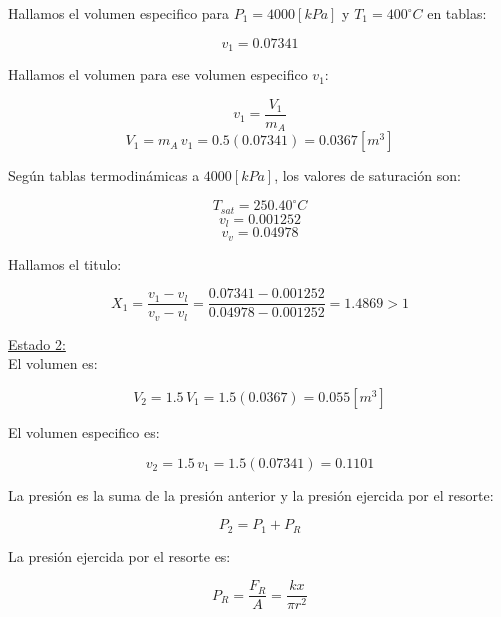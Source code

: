 \documentclass[letter,11pt]{article}
\begin{document}
\begin{enumerate}
Hallamos el volumen especifico para $P_1=4000[kPa]$ y $T_1=400^\circ C$ en tablas:

\begin{equation*}
    v_1=0.07341
\end{equation*}

Hallamos el volumen para ese volumen especifico $v_1$:

\begin{equation*}
    v_1=\frac{V_1}{m_A}
\end{equation*}
\begin{equation*}
    V_1=m_A\,v_1=0.5(0.07341)=0.0367[m^3]
\end{equation*}

Según tablas termodinámicas a $4000[kPa]$, los valores de saturación son:

\begin{equation*}
    T_{sat}=250.40^\circ C
\end{equation*}
\begin{equation*}
    v_l=0.001252
\end{equation*}
\begin{equation*}
    v_v=0.04978
\end{equation*}

Hallamos el titulo:

\begin{equation*}
    X_1=\frac{v_1-v_l}{v_v-v_l}=\frac{0.07341-0.001252}{0.04978-0.001252}=1.4869>1
\end{equation*}

\underline{Estado 2:} \\

El volumen es:

\begin{equation*}
    V_2=1.5\,V_1=1.5(0.0367)=0.055[m^3]
\end{equation*}

El volumen especifico es:

\begin{equation*}
    v_2=1.5\,v_1=1.5(0.07341)=0.1101
\end{equation*}

La presión es la suma de la presión anterior y la presión ejercida por el resorte:

\begin{equation*}
    P_2=P_1+P_R
\end{equation*}

La presión ejercida por el resorte es:

\begin{equation*}
    P_R=\frac{F_R}{A}=\frac{kx}{\pi r^2}
\end{equation*}


\end{enumerate}
\end{document}
